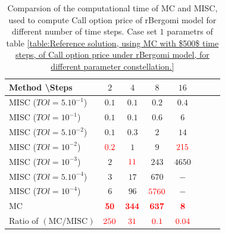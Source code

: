 \documentclass[11pt]{article}
\begin{document}
\begin{table}[h!]
	\centering
	\begin{tabular}{l*{6}{c}r}
		Method \textbackslash  Steps            & $2$ & $4$ & $8$ & $16$ &   \\
		\hline
		MISC ($TOl=5.10^{-1}$)  & $0.1$ & $0.1$ & $0.2$ & $0.4$  \\
		MISC ($TOl=10^{-1}$)  & $0.1$ & $0.1$ & $0.6$ & $6$  \\
		MISC ($TOl=5.10^{-2}$)  & $0.1$ & $0.3$ & $2$ & $14$  \\
		MISC ($TOl=10^{-2}$)  & ${\color{red}0.2}$ & $1$ & $9$ & ${\color{red}215}$  \\
		MISC ($TOl=10^{-3}$)  & $2$ & ${\color{red}11}$ & $243$ & $4650$  \\
			MISC ($TOl=5.10^{-4}$)  & $3$ & $17$ & $ 670$ & $-$  \\
		MISC ($TOl=10^{-4}$)  & $6$ & $96$ & ${\color{red}5760}$ & $-$  \\
		\hline
			MC     & $\mathbf{{\color{red} 50}}$  & $\mathbf{{\color{red}344}}$  & $\mathbf{{\color{red}637}}$ & $\mathbf{{\color{red}8}}$  \\
	\hline
			Ratio of $\left(\text{MC}/ \text{MISC} \right)$  &${\color{red}  250}$ & ${\color{red}    31
		}$  & ${\color{red} 0.1
		}$  & ${\color{red}  0.04}$ \\
		\hline
	\end{tabular}
	\caption{Comparsion of the computational time of  MC and MISC, used to compute Call option price of rBergomi model for different number of time steps. Case set $1$ parametrs of table \ref{table:Reference solution, using MC with $500$ time steps, of Call option price under rBergomi model, for different parameter constellation.} }
	\label{Comparison of the computational time of  MC and MISC, used to compute Call option price of rBergomi model for different number of time steps. Case set1}
\end{table}
\end{document}
